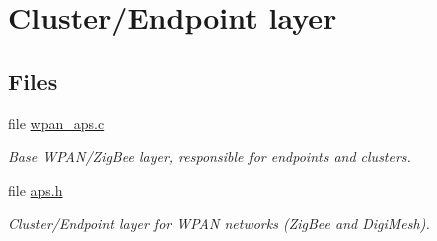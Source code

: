 \hypertarget{group__wpan__aps}{}\section{Cluster/\+Endpoint layer}
\label{group__wpan__aps}
\subsection*{Files}
\begin{DoxyCompactItemize}
\item 
file \hyperlink{wpan__aps_8c}{wpan\+\_\+aps.\+c}
\begin{DoxyCompactList}\small\item\em Base W\+P\+A\+N/\+Zig\+Bee layer, responsible for endpoints and clusters. \end{DoxyCompactList}\item 
file \hyperlink{aps_8h}{aps.\+h}
\begin{DoxyCompactList}\small\item\em Cluster/\+Endpoint layer for W\+P\+AN networks (Zig\+Bee and Digi\+Mesh). \end{DoxyCompactList}\end{DoxyCompactItemize}
